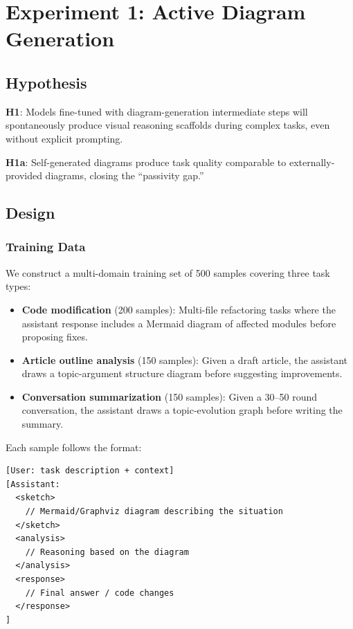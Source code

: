 \documentclass[11pt,a4paper]{article}
\begin{document}
\section{Experiment 1: Active Diagram Generation}

\subsection{Hypothesis}

\textbf{H1}: Models fine-tuned with diagram-generation intermediate steps will spontaneously produce visual reasoning scaffolds during complex tasks, even without explicit prompting.

\textbf{H1a}: Self-generated diagrams produce task quality comparable to externally-provided diagrams, closing the ``passivity gap.''

\subsection{Design}

\subsubsection{Training Data}

We construct a multi-domain training set of 500 samples covering three task types:
\begin{itemize}[nosep]
\item \textbf{Code modification} (200 samples): Multi-file refactoring tasks where the assistant response includes a Mermaid diagram of affected modules before proposing fixes.
\item \textbf{Article outline analysis} (150 samples): Given a draft article, the assistant draws a topic-argument structure diagram before suggesting improvements.
\item \textbf{Conversation summarization} (150 samples): Given a 30--50 round conversation, the assistant draws a topic-evolution graph before writing the summary.
\end{itemize}

Each sample follows the format:
\begin{verbatim}
[User: task description + context]
[Assistant: 
  <sketch>
    // Mermaid/Graphviz diagram describing the situation
  </sketch>
  <analysis>
    // Reasoning based on the diagram
  </analysis>
  <response>
    // Final answer / code changes
  </response>
]
\end{verbatim}
\end{document}
